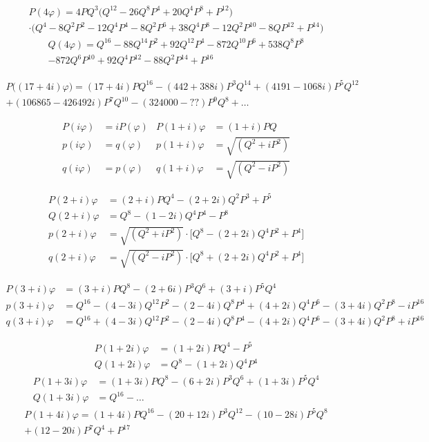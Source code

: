 \documentclass[10pt,a4paper]{article}
\begin{document}
\begin{multline*}
P(4\varphi) = 4PQ^3\bigl(Q^{12}-26Q^8P^4+20Q^4P^8+P^{12}\bigr)\\
\cdot\bigl(Q^4-8Q^2P^2-12Q^4P^4-8Q^2P^6+38Q^4P^8-12Q^2P^{10}-8QP^{12}+P^{14}\bigr)
\end{multline*}
\begin{multline*}
Q(4\varphi) = Q^{16} - 88Q^{14}P^2 + 92Q^{12}P^4 - 872Q^{10}P^6 + 538Q^8P^8\\
- 872Q^6P^{10} + 92Q^4P^{12} - 88Q^2P^{14} + P^{16}
\end{multline*}

\begin{multline*}
P\bigl((17+4i)\varphi\bigr) = (17+4i)PQ^{16} - (442+388i)P^3Q^{14} + (4191-1068i)P^5Q^{12}\\
+ (106865-426492i)P^7Q^{10} - (324000-??)P^9Q^8 + \ldots
\end{multline*}

\begin{align*}
P(i\varphi) &= iP(\varphi) & P(1+i)\varphi &= (1+i)PQ\\
p(i\varphi) &= q(\varphi) & p(1+i)\varphi &= \sqrt{(Q^2+iP^2)}\\
q(i\varphi) &= p(\varphi) & q(1+i)\varphi &= \sqrt{(Q^2-iP^2)}
\end{align*}

\begin{align*}
P(2+i)\varphi &= (2+i)PQ^4 - (2+2i)Q^2P^3 + P^5\\
Q(2+i)\varphi &= Q^8 - (1-2i)Q^4P^4 - P^8\\
p(2+i)\varphi &= \sqrt{(Q^2+iP^2)}\cdot\bigl[Q^8-(2+2i)Q^4P^2+P^4\bigr]\\
q(2+i)\varphi &= \sqrt{(Q^2-iP^2)}\cdot\bigl[Q^8+(2+2i)Q^4P^2+P^4\bigr]
\end{align*}

\begin{align*}
P(3+i)\varphi &= (3+i)PQ^8 - (2+6i)P^3Q^6 + (3+i)P^5Q^4\\
p(3+i)\varphi &= Q^{16} - (4-3i)Q^{12}P^2 - (2-4i)Q^8P^4 + (4+2i)Q^4P^6 - (3+4i)Q^2P^8 - iP^{16}\\
q(3+i)\varphi &= Q^{16} + (4-3i)Q^{12}P^2 - (2-4i)Q^8P^4 - (4+2i)Q^4P^6 - (3+4i)Q^2P^8 + iP^{16}
\end{align*}

\begin{align*}
P(1+2i)\varphi &= (1+2i)PQ^4 - P^5\\
Q(1+2i)\varphi &= Q^8 - (1+2i)Q^4P^4
\end{align*}
\begin{align*}
P(1+3i)\varphi &= (1+3i)PQ^8 - (6+2i)P^3Q^6 + (1+3i)P^5Q^4\\
Q(1+3i)\varphi &= Q^{16} - \ldots
\end{align*}
\begin{multline*}
P(1+4i)\varphi = (1+4i)PQ^{16} - (20+12i)P^3Q^{12} - (10-28i)P^5Q^8\\
+ (12-20i)P^7Q^4 + P^{17}
\end{multline*}
\end{document}
